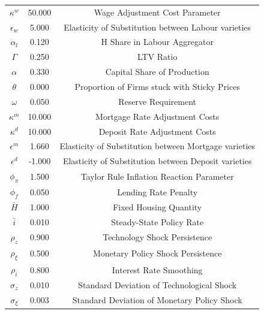 \begin{center}
\begin{longtable}{ccc}
$\kappa^w$ 	 & 	 50.000 	 & 	 Wage Adjustment Cost Parameter\\
$\epsilon_w$ 	 & 	 5.000 	 & 	 Elasticity of Substitution between Labour varieties\\
$\alpha_l$ 	 & 	 0.120 	 & 	 H Share in Labour Aggregator\\
$\Gamma$ 	 & 	 0.250 	 & 	 LTV Ratio\\
$\alpha$ 	 & 	 0.330 	 & 	 Capital Share of Production\\
$\theta$ 	 & 	 0.000 	 & 	 Proportion of Firms stuck with Sticky Prices\\
$\omega$ 	 & 	 0.050 	 & 	 Reserve Requirement\\
$\kappa^m$ 	 & 	 10.000 	 & 	 Mortgage Rate Adjustment Costs\\
$\kappa^d$ 	 & 	 10.000 	 & 	 Deposit Rate Adjustment Costs\\
$\epsilon^m$ 	 & 	 1.660 	 & 	 Elasticity of Substitution between Mortgage varieties\\
$\epsilon^d$ 	 & 	 -1.000 	 & 	 Elasticity of Substitution between Deposit varieties\\
$\phi_\pi$ 	 & 	 1.500 	 & 	 Taylor Rule Inflation Reaction Parameter\\
$\phi_f$ 	 & 	 0.050 	 & 	 Lending Rate Penalty\\
$\bar{H}$ 	 & 	 1.000 	 & 	 Fixed Housing Quantity\\
$\bar{i}$ 	 & 	 0.010 	 & 	 Steady-State Policy Rate\\
$\rho_z$ 	 & 	 0.900 	 & 	 Technology Shock Persistence\\
$\rho_\xi$ 	 & 	 0.500 	 & 	 Monetary Policy Shock Persistence\\
$\rho_i$ 	 & 	 0.800 	 & 	 Interest Rate Smoothing\\
$\sigma_z$ 	 & 	 0.010 	 & 	 Standard Deviation of Technological Shock\\
$\sigma_\xi$ 	 & 	 0.003 	 & 	 Standard Deviation of Monetary Policy Shock\\
\bottomrule%
\end{longtable}
\end{center}
